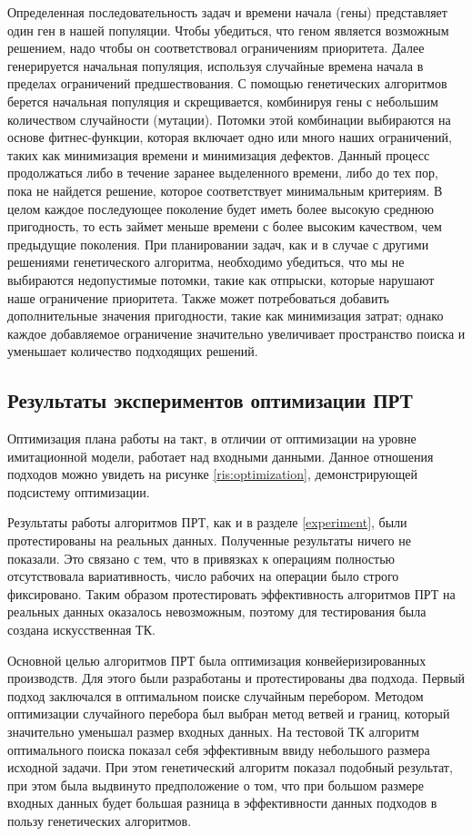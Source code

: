 Определенная последовательность задач и времени начала (гены) представляет один ген в нашей популяции. Чтобы убедиться, что геном является возможным решением, надо чтобы он соответствовал ограничениям приоритета. Далее генерируется начальная популяция, используя случайные времена начала в пределах ограничений предшествования. С помощью генетических алгоритмов берется начальная популяция и скрещивается, комбинируя гены с небольшим количеством случайности (мутации). Потомки этой комбинации выбираются на основе фитнес-функции, которая включает одно или много наших ограничений, таких как минимизация времени и минимизация дефектов. Данный процесс продолжаться либо в течение заранее выделенного времени, либо до тех пор, пока не найдется решение, которое соответствует минимальным критериям. В целом каждое последующее поколение будет иметь более высокую среднюю пригодность, то есть займет меньше времени с более высоким качеством, чем предыдущие поколения. При планировании задач, как и в случае с другими решениями генетического алгоритма, необходимо убедиться, что мы не выбираются недопустимые потомки, такие как отпрыски, которые нарушают наше ограничение приоритета. Также может потребоваться добавить дополнительные значения пригодности, такие как минимизация затрат; однако каждое добавляемое ограничение значительно увеличивает пространство поиска и уменьшает количество подходящих решений.

\subsection{Результаты экспериментов оптимизации ПРТ}
Оптимизация плана работы на такт, в отличии от оптимизации на уровне имитационной модели, работает над входными данными. Данное отношения подходов можно увидеть на рисунке \ref{ris:optimization}, демонстрирующей подсистему оптимизации. 

Результаты работы алгоритмов ПРТ, как и в разделе \ref{experiment}, были протестированы на реальных данных. 
Полученные результаты ничего не показали. Это связано с тем, что в привязках к операциям полностью отсутствовала вариативность, число рабочих на операции было строго фиксировано. Таким образом протестировать эффективность алгоритмов ПРТ на реальных данных оказалось невозможным, поэтому для тестирования была создана искусственная ТК.

Основной целью алгоритмов ПРТ была оптимизация конвейеризированных производств. Для этого были разработаны и протестированы два подхода. 
Первый подход заключался в оптимальном поиске случайным перебором. Методом оптимизации случайного перебора был выбран метод ветвей и границ, который значительно уменьшал размер входных данных.
На тестовой ТК алгоритм оптимального поиска показал себя эффективным ввиду небольшого размера исходной задачи.
При этом генетический алгоритм показал подобный результат, при этом была выдвинуто предположение о том, что при большом размере входных данных будет большая разница в эффективности данных подходов в пользу генетических алгоритмов.

